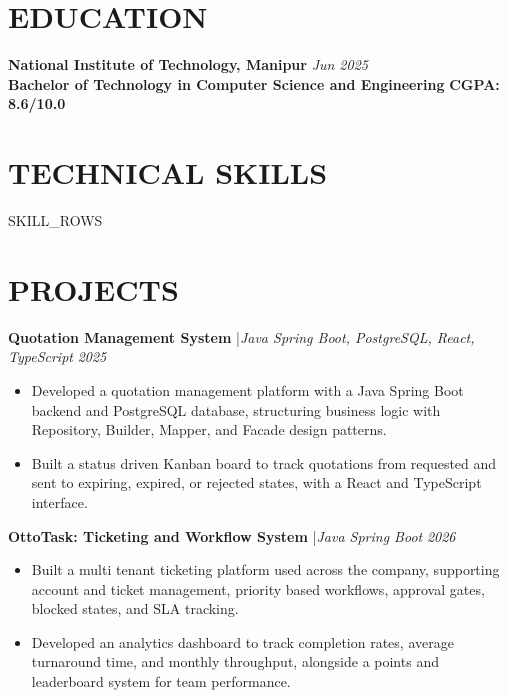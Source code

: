 \documentclass[a4paper,10pt]{article}
\newcommand{\projrow}[3]{%
    \noindent
    {\bfseries\color{dark}#1}%
    {\color{light}\enspace|\enspace\small\itshape #2}%
    \hfill{\small\color{light}\itshape #3}%
}
\begin{document}

\section{EDUCATION}

\noindent
{\bfseries\color{dark}National Institute of Technology, Manipur}
\hfill{\small\itshape Jun 2025}\\
{\bfseries Bachelor of Technology in Computer Science and Engineering}
\hfill{\bfseries\color{dark}CGPA: 8.6/10.0}


\section{TECHNICAL SKILLS}

{{SKILL_ROWS}}


\section{PROJECTS}

\projrow{Quotation Management System}
{Java Spring Boot, PostgreSQL, React, TypeScript}{2025}

\vspace{2pt}

\begin{itemize}

\item Developed a quotation management platform with a Java Spring Boot
backend and PostgreSQL database, structuring business logic with
Repository, Builder, Mapper, and Facade design patterns.

\item Built a status driven Kanban board to track quotations from
requested and sent to expiring, expired, or rejected states, with a
React and TypeScript interface.

\end{itemize}

\vspace{3pt}

\projrow{OttoTask: Ticketing and Workflow System}
{Java Spring Boot}{2026}

\vspace{2pt}

\begin{itemize}

\item Built a multi tenant ticketing platform used across the company,
supporting account and ticket management, priority based workflows,
approval gates, blocked states, and SLA tracking.

\item Developed an analytics dashboard to track completion rates,
average turnaround time, and monthly throughput, alongside a points
and leaderboard system for team performance.

\end{itemize}
\end{document}

